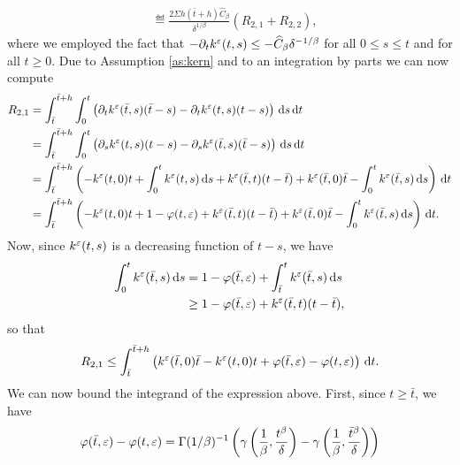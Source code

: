 \documentclass[10pt]{article}
\begin{document}
\begin{appendices}
\begin{equation}
\begin{aligned}
&\eqdef \frac{2 \Sigma h(\bar t + h)  \widehat C_\beta}{\delta^{1/\beta}}\left(R_{2,1} + R_{2,2}\right),
\end{aligned}
\end{equation}
where we employed the fact that $-\partial_t k^\varepsilon(t,s) \leq -\widehat C_\beta \delta^{-1/\beta}$ for all $0 \leq s \leq t$ and for all $t \geq 0$. Due to Assumption \ref{as:kern} and to an integration by parts we can now compute
\begin{equation}
\begin{aligned}
	R_{2,1} &= \int_{\bar t}^{\bar t + h}\int_0^t \left(\partial_t k^\varepsilon(\bar t, s)(\bar t - s) - \partial_t k^\varepsilon(t, s)(t-s) \right) \,\mathrm{d} s \,\mathrm{d} t \\
	&= \int_{\bar t}^{\bar t + h} \int_0^t \left( \partial_s k^\varepsilon(t, s)(t-s) - \partial_s k^\varepsilon(\bar t, s)(\bar t - s) \right) \,\mathrm{d} s \,\mathrm{d} t \\
	&= \int_{\bar t}^{\bar t + h} \left(-k^\varepsilon(t,0)t + \int_0^t k^\varepsilon(t, s) \,\mathrm{d} s + k^\varepsilon(\bar t, t)(t - \bar t) + k^\varepsilon(\bar t, 0)\bar t - \int_0^t k^\varepsilon(\bar t, s) \,\mathrm{d} s \right)\,\mathrm{d} t\\
	&= \int_{\bar t}^{\bar t + h} \left(-k^\varepsilon(t,0)t + 1 - \varphi(t, \varepsilon) + k^\varepsilon(\bar t, t)(t - \bar t) + k^\varepsilon(\bar t, 0)\bar t -\int_0^t k^\varepsilon(\bar t, s) \,\mathrm{d} s \right) \,\mathrm{d} t.
\end{aligned}
\end{equation} 
Now, since $k^\varepsilon(t, s)$ is a decreasing function of $t-s$, we have
\begin{equation}
\begin{aligned}
	\int_0^t k^\varepsilon(\bar t, s) \,\mathrm{d} s &= 1 - \varphi(\bar t, \varepsilon) + \int_{\bar t}^{t} k^\varepsilon(\bar t, s) \,\mathrm{d} s\\
	&\geq 1 - \varphi(\bar t, \varepsilon) + k^\varepsilon(\bar t, t)(t - \bar t),
\end{aligned}
\end{equation}
so that
\begin{equation}
\begin{aligned}
	R_{2,1} \leq \int_{\bar t}^{\bar t + h} \left(k^\varepsilon(\bar t, 0)\bar t - k^\varepsilon(t,0)t + \varphi(\bar t, \varepsilon) - \varphi(t, \varepsilon) \right) \,\mathrm{d} t.
\end{aligned}
\end{equation}
We can now bound the integrand of the expression above. First, since $t \geq \bar t$, we have
\begin{equation}
\begin{aligned}
	\phi(\bar t, \epl) - \phi(t, \epl) &= \Gamma(1/\beta)^{-1}\left(\gamma\left(\frac1\beta, \frac{t^\beta}{\delta}\right) - \gamma\left(\frac1\beta, \frac{\bar t^\beta}{\delta}\right) \right)\\

\end{aligned}
\end{equation}
\end{appendices}
\end{document}
